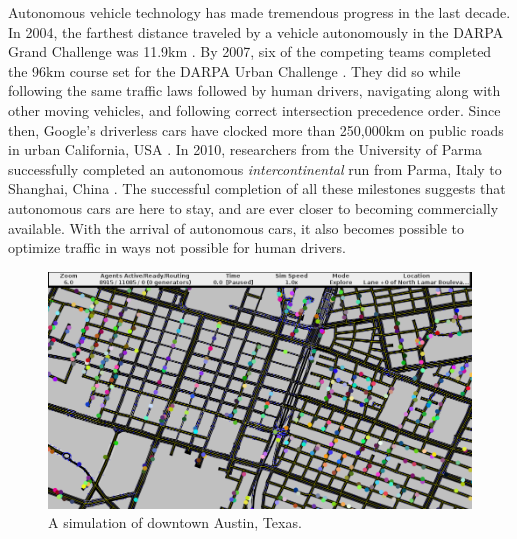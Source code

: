\documentclass[letterpaper, 10 pt, conference]{ieeeconf}  %
\begin{document}
Autonomous vehicle technology has made tremendous progress in the last decade.
In 2004, the farthest distance traveled by a vehicle autonomously in the DARPA
Grand Challenge was 11.9km \cite{cnnGrandChallenge2004}. By 2007, six of the
competing teams completed the 96km course set for the DARPA Urban Challenge
\cite{spectrumUrbanChallenge2007}. They did so while following the same traffic
laws followed by human drivers, navigating along with other moving vehicles,
and following correct intersection precedence order. Since then, Google's
driverless cars have clocked more than 250,000km on public roads in urban
California, USA \cite{tedThrun2011}. In 2010, researchers from the University
of Parma successfully completed an autonomous \textit{intercontinental} run
from Parma, Italy to Shanghai, China \cite{cnnVislab2010}. The successful
completion of all these milestones suggests that autonomous cars are here to
stay, and are ever closer to becoming commercially available. With the arrival
of autonomous cars, it also becomes possible to optimize traffic in ways not
possible for human drivers. 


\begin{figure}[t]
  \centering \includegraphics[width=\linewidth]{downtown_atx.png}
  \caption{A simulation of downtown Austin, Texas.}
  \label{fig:ui_screenshot}
  \vspace{-15pt}
\end{figure}
\end{document}

